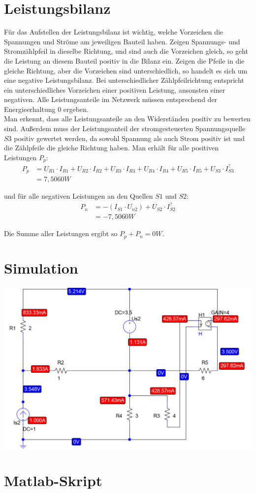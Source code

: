 \documentclass[11pt]{scrartcl}
\begin{document}
\section{Leistungsbilanz}
Für das Aufstellen der Leistungsbilanz ist wichtig, welche Vorzeichen die Spannungen und Ströme am jeweiligen Bauteil haben.
Zeigen Spannungs- und Stromzählpfeil in dieselbe Richtung, und sind auch die Vorzeichen gleich, so geht die Leistung an
diesem Bauteil positiv in die Bilanz ein.
Zeigen die Pfeile in die gleiche Richtung, aber die Vorzeichen sind unterschiedlich, so handelt es sich um eine negative Leistungsbilanz.
Bei unterschiedlicher Zählpfeilrichtung entspricht ein unterschiedliches Vorzeichen einer positiven Leistung, ansonsten einer negativen.
Alle Leistungsanteile im Netzwerk müssen entsprechend der Energieerhaltung 0 ergeben. \\
Man erkennt, dass alle Leistungsanteile an den Widerständen positiv zu bewerten sind.
Außerdem muss der Leistungsanteil der stromgesteuerten Spannungsquelle $S3$ positiv gewertet werden, da sowohl
Spannung als auch Strom positiv ist und die Zählpfeile die gleiche Richtung haben.
Man erhält für alle positiven Leistungen $P_p$:
\begin{align*}
  P_p &= U_{R1} \cdot I_{R1} +
        U_{R2} \cdot I_{R2} +
        U_{R3} \cdot I_{R3} +
        U_{R4} \cdot I_{R4} +
        U_{R5} \cdot I_{R5} +
        U_{S3} \cdot I_{S3}^? \\
      &= 7,5060 \unit{W}
      \end{align*}

und für alle negativen Leistungen an den Quellen $S1$ und $S2$:
\begin{align*}
  P_n &= -(I_{S1} \cdot U_{n2}) + U_{S2} \cdot I_{S2}^? \\
      &= -7,5060 \unit{W}
\end{align*}

Die Summe aller Leistungen ergibt so $P_p + P_n = 0 \unit{W}$.


\section{Simulation}
\begin{center}
  \includegraphics[width=.8\linewidth]{./Assets/PSpice_Schaltplan}
  \label{fig:A1}
\end{center}

\newpage
\section{Matlab-Skript}


\end{document}
